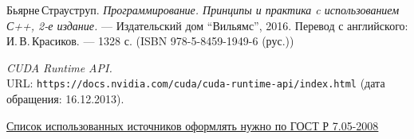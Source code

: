 \begin{thebibliography}{99}
Бьярне\,Страуструп.
{\itshape Программирование. Принципы и практика c использованием С++, 2-е издание.} --- Издательский дом \enquote{Вильямс}, 2016. Перевод с английского: И.\,В.\,Красиков. --- 1328 с. (ISBN 978-5-8459-1949-6 (рус.))

{\itshape CUDA Runtime API.} \\URL: \texttt{https://docs.nvidia.com/cuda/cuda-runtime-api/index.html} (дата обращения: 16.12.2013).

\href{http://www.ifap.ru/library/gost/7052008.pdf}{Список использованных источников оформлять нужно по ГОСТ Р 7.05-2008}

\end{thebibliography}
